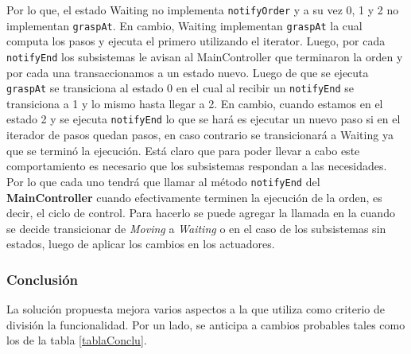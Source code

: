 Por lo que, el estado Waiting no implementa \verb|notifyOrder| y a su vez 0, 1 y 2 no implementan \verb|graspAt|. En cambio, Waiting implementan \verb|graspAt| la cual computa los pasos y ejecuta el primero utilizando el iterator. Luego, por cada \verb|notifyEnd| los subsistemas le avisan al MainController que terminaron la orden y por cada una transaccionamos a un estado nuevo. Luego de que se ejecuta \verb|graspAt| se transiciona al estado 0 en el cual al recibir un \verb|notifyEnd| se transiciona a 1 y lo mismo hasta llegar a 2. En cambio, cuando estamos en el estado 2 y se ejecuta \verb|notifyEnd| lo que se hará es ejecutar un nuevo paso si en el iterador de pasos quedan pasos, en caso contrario se transicionará a Waiting ya que se terminó la ejecución. Está claro que para poder llevar a cabo este comportamiento es necesario que los subsistemas respondan a las necesidades. Por lo que cada uno tendrá que llamar al método \verb|notifyEnd| del \textbf{MainController} cuando efectivamente terminen la ejecución de la orden, es decir, el ciclo de control. Para hacerlo se puede agregar la llamada en la cuando se decide transicionar de \textit{Moving} a \textit{Waiting} o en el caso de los subsistemas sin estados, luego de aplicar los cambios en los actuadores.

\subsubsection*{Conclusión}

La solución propuesta mejora varios aspectos a la que utiliza como criterio de división la funcionalidad. Por un lado, se anticipa a cambios probables tales como los de la tabla \ref{tablaConclu}.

\begin{table}[h]
\centering
\caption{Anticipos al cambio del diseño propuesto para el brazo robótico.}
\label{tablaConclu}
\end{table}

